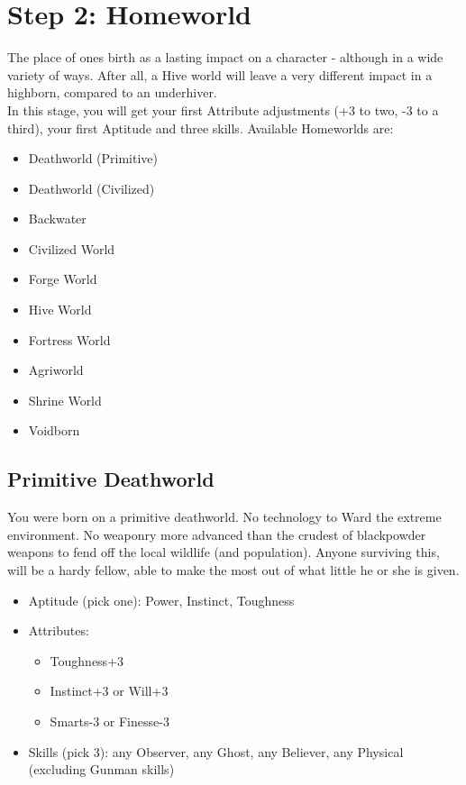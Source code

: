 \section{Step 2: Homeworld} %
\label{sec:lifepath_2_Homeworld}
The place of ones birth as a lasting impact on a character - although in a wide variety of ways. After all, a Hive world will leave a very different impact in a highborn, compared to an underhiver.\\
In this stage, you will get your first Attribute adjustments (+3 to two, -3 to a third), your first Aptitude and three skills.
Available Homeworlds are:
\begin{itemize}
	\item Deathworld (Primitive)
	\item Deathworld (Civilized)
	\item Backwater
	\item Civilized World
	\item Forge World
	\item Hive World
	\item Fortress World
	\item Agriworld
	\item Shrine World
	\item Voidborn
\end{itemize}


\subsection{Primitive Deathworld}
You were born on a primitive deathworld. No technology to Ward the extreme environment. No weaponry more advanced than the crudest of blackpowder weapons to fend off the local wildlife (and population). Anyone surviving this, will be a hardy fellow, able to make the most out of what little he or she is given.

\begin{itemize}
	\item Aptitude (pick one): Power, Instinct, Toughness
	\item Attributes: 
	\begin{itemize}
		\item Toughness+3
		\item Instinct+3 or Will+3
		\item Smarts-3 or Finesse-3
	\end{itemize}
	\item Skills (pick 3): any Observer, any Ghost, any Believer, any Physical (excluding Gunman skills)
\end{itemize}

